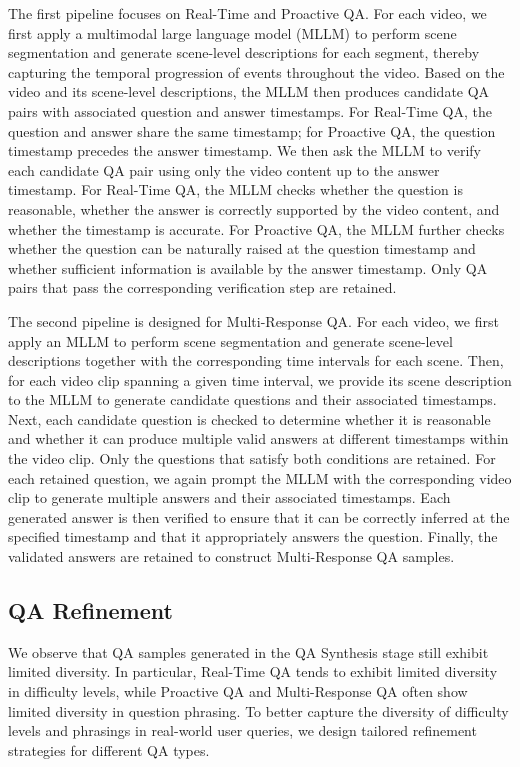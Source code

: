 The first pipeline focuses on Real-Time and Proactive QA. For each video, we first apply a multimodal large language model (MLLM) to perform scene segmentation and generate scene-level descriptions for each segment, thereby capturing the temporal progression of events throughout the video. Based on the video and its scene-level descriptions, the MLLM then produces candidate QA pairs with associated question and answer timestamps. For Real-Time QA, the question and answer share the same timestamp; for Proactive QA, the question timestamp precedes the answer timestamp. We then ask the MLLM to verify each candidate QA pair using only the video content up to the answer timestamp. For Real-Time QA, the MLLM checks whether the question is reasonable, whether the answer is correctly supported by the video content, and whether the timestamp is accurate. For Proactive QA, the MLLM further checks whether the question can be naturally raised at the question timestamp and whether sufficient information is available by the answer timestamp. Only QA pairs that pass the corresponding verification step are retained.


The second pipeline is designed for Multi-Response QA. For each video, we first apply an MLLM to perform scene segmentation and generate scene-level descriptions together with the corresponding time intervals for each scene. Then, for each video clip spanning a given time interval, we provide its scene description to the MLLM to generate candidate questions and their associated timestamps. Next, each candidate question is checked to determine whether it is reasonable and whether it can produce multiple valid answers at different timestamps within the video clip. Only the questions that satisfy both conditions are retained. For each retained question, we again prompt the MLLM with the corresponding video clip to generate multiple answers and their associated timestamps. Each generated answer is then verified to ensure that it can be correctly inferred at the specified timestamp and that it appropriately answers the question. Finally, the validated answers are retained to construct Multi-Response QA samples.





\subsection{QA Refinement}

We observe that QA samples generated in the QA Synthesis stage still exhibit limited diversity. In particular, Real-Time QA tends to exhibit limited diversity in difficulty levels, while Proactive QA and Multi-Response QA often show limited diversity in question phrasing. To better capture the diversity of difficulty levels and phrasings in real-world user queries, we design tailored refinement strategies for different QA types.

